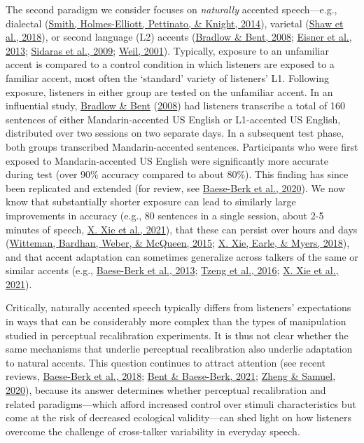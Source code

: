 \documentclass[
  11pt,
  english,
  man,floatsintext]{apa6}
\begin{document}
The second paradigm we consider focuses on \emph{naturally} accented speech---e.g., dialectal (\protect\hyperlink{ref-smith2014}{Smith, Holmes-Elliott, Pettinato, \& Knight, 2014}), varietal (\protect\hyperlink{ref-shaw2018}{Shaw et al., 2018}), or second language (L2) accents (\protect\hyperlink{ref-bradlow-bent2008}{Bradlow \& Bent, 2008}; \protect\hyperlink{ref-eisner2013}{Eisner et al., 2013}; \protect\hyperlink{ref-sidaras2009}{Sidaras et al., 2009}; \protect\hyperlink{ref-weil2001a}{Weil, 2001}). Typically, exposure to an unfamiliar accent is compared to a control condition in which listeners are exposed to a familiar accent, most often the `standard' variety of listeners' L1. Following exposure, listeners in either group are tested on the unfamiliar accent. In an influential study, \protect\hyperlink{ref-bradlow-bent2008}{Bradlow \& Bent} (\protect\hyperlink{ref-bradlow-bent2008}{2008}) had listeners transcribe a total of 160 sentences of either Mandarin-accented US English or L1-accented US English, distributed over two sessions on two separate days. In a subsequent test phase, both groups transcribed Mandarin-accented sentences. Participants who were first exposed to Mandarin-accented US English were significantly more accurate during test (over 90\% accuracy compared to about 80\%). This finding has since been replicated and extended (for review, see \protect\hyperlink{ref-baeseberk2020}{Baese-Berk et al., 2020}). We now know that substantially shorter exposure can lead to similarly large improvements in accuracy (e.g., 80 sentences in a single session, about 2-5 minutes of speech, \protect\hyperlink{ref-xie2021jep}{X. Xie et al., 2021}), that these can persist over hours and days (\protect\hyperlink{ref-witteman2015}{Witteman, Bardhan, Weber, \& McQueen, 2015}; \protect\hyperlink{ref-xie2018lcn}{X. Xie, Earle, \& Myers, 2018}), and that accent adaptation can sometimes generalize across talkers of the same or similar accents (e.g., \protect\hyperlink{ref-baeseberk2013}{Baese-Berk et al., 2013}; \protect\hyperlink{ref-tzeng2016}{Tzeng et al., 2016}; \protect\hyperlink{ref-xie2021jep}{X. Xie et al., 2021}).

Critically, naturally accented speech typically differs from listeners' expectations in ways that can be considerably more complex than the types of manipulation studied in perceptual recalibration experiments. It is thus not clear whether the same mechanisms that underlie perceptual recalibration also underlie adaptation to natural accents. This question continues to attract attention (see recent reviews, \protect\hyperlink{ref-baeseberk2018}{Baese-Berk et al., 2018}; \protect\hyperlink{ref-bent-baeseberk2021}{Bent \& Baese-Berk, 2021}; \protect\hyperlink{ref-zheng-samuel2020}{Zheng \& Samuel, 2020}), because its answer determines whether perceptual recalibration and related paradigms---which afford increased control over stimuli characteristics but come at the risk of decreased ecological validity---can shed light on how listeners overcome the challenge of cross-talker variability in everyday speech.
\end{document}
